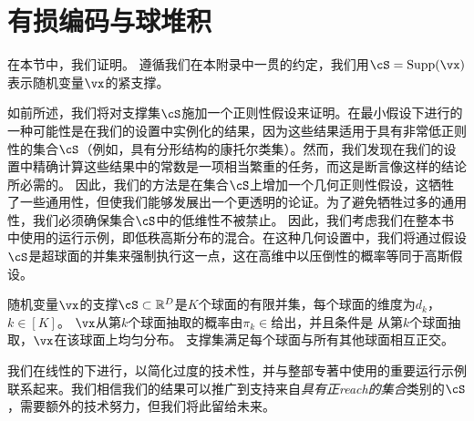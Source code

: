\documentclass[../../book-main.tex]{subfiles}
\begin{document}
\section{有损编码与球堆积}\label{app:rate-distortion-covering}

在本节中，我们证明。
遵循我们在本附录中一贯的约定，我们用$\cS = \Supp(\vx)$表示随机变量$\vx$的紧支撑。

如前所述，我们将对支撑集$\cS$施加一个正则性假设来证明。在最小假设下进行的一种可能性是在我们的设置中实例化\cite{Riegler2018-jh,Riegler2023-rr}的结果，因为这些结果适用于具有非常低正则性的集合$\cS$（例如，具有分形结构的康托尔类集）。然而，我们发现在我们的设置中精确计算这些结果中的常数是一项相当繁重的任务，而这是断言像这样的结论所必需的。
因此，我们的方法是在集合$\cS$上增加一个几何正则性假设，这牺牲了一些通用性，但使我们能够发展出一个更透明的论证。为了避免牺牲过多的通用性，我们必须确保集合$\cS$中的低维性不被禁止。
因此，我们考虑我们在整本书中使用的运行示例，即低秩高斯分布的混合。在这种几何设置中，我们将通过假设$\cS$是超球面的并集来强制执行这一点，这在高维中以压倒性的概率等同于高斯假设。

\begin{assumption}\label{assumption:union-of-spheres}
    随机变量$\vx$的支撑$\cS \subset \R^D$是$K$个球面的有限并集，每个球面的维度为$d_k$，$k \in [K]$。
    $\vx$从第$k$个球面抽取的概率由$\pi_k \in$给出，并且条件是 从第$k$个球面抽取，$\vx$在该球面上均匀分布。
    支撑集满足每个球面与所有其他球面相互正交。
\end{assumption}

我们在线性的下进行，以简化过度的技术性，并与整部专著中使用的重要运行示例联系起来。我们相信我们的结果可以推广到支持来自\textit{具有正reach的集合}类别的$\cS$，需要额外的技术努力，但我们将此留给未来。
\end{document}
